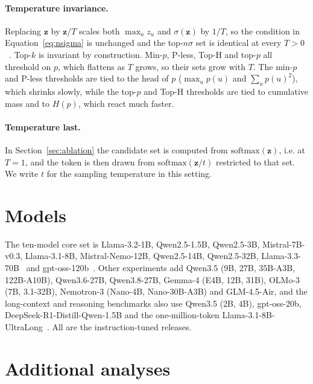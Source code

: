 \documentclass{article}
\begin{document}
\paragraph{Temperature invariance.}
Replacing $\mathbf{z}$ by $\mathbf{z}/T$ scales both $\max_u z_u$ and $\sigma(\mathbf{z})$ by $1/T$, so the condition in Equation~\ref{eq:nsigma} is unchanged and the top-$n\sigma$ set is identical at every $T{>}0$~\citep{tang2024topnsigma}. Top-$k$ is invariant by construction. Min-$p$, P-less, Top-H and top-$p$ all threshold on $p$, which flattens as $T$ grows, so their sets grow with $T$. The min-$p$ and P-less thresholds are tied to the head of $p$ ($\max_u p(u)$ and $\sum_u p(u)^2$), which shrinks slowly, while the top-$p$ and Top-H thresholds are tied to cumulative mass and to $H(p)$, which react much faster.

\paragraph{Temperature last.}
In Section~\ref{sec:ablation} the candidate set is computed from $\mathrm{softmax}(\mathbf{z})$, i.e. at $T{=}1$, and the token is then drawn from $\mathrm{softmax}(\mathbf{z}/t)$ restricted to that set. We write $t$ for the sampling temperature in this setting.

\section{Models}
\label{app:models}
The ten-model core set is Llama-3.2-1B, Qwen2.5-1.5B, Qwen2.5-3B, Mistral-7B-v0.3, Llama-3.1-8B, Mistral-Nemo-12B, Qwen2.5-14B, Qwen2.5-32B, Llama-3.3-70B~\citep{dubey2024llama3,yang2024qwen2,jiang2023mistral} and gpt-oss-120b~\citep{openai2025gptoss}. Other experiments add Qwen3.5 (9B, 27B, 35B-A3B, 122B-A10B), Qwen3.6-27B, Qwen3.8-27B, Gemma-4 (E4B, 12B, 31B), OLMo-3 (7B, 3.1-32B), Nemotron-3 (Nano-4B, Nano-30B-A3B) and GLM-4.5-Air, and the long-context and reasoning benchmarks also use Qwen3.5 (2B, 4B), gpt-oss-20b, DeepSeek-R1-Distill-Qwen-1.5B and the one-million-token Llama-3.1-8B-UltraLong~\citep{xu2025ultralong}. All are the instruction-tuned releases.

\section{Additional analyses}
\label{app:extra}
\end{document}
